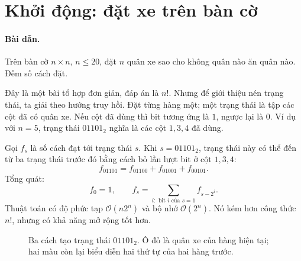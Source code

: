 \documentclass[11pt]{article}
\newcommand{\Oh}{\mathcal{O}}
\newcommand{\filledcell}[3]{\fill[#3] (#1,#2) rectangle ++(1,1);}
\begin{document}
\section{Khởi động: đặt xe trên bàn cờ}

\paragraph{Bài dẫn.}
Trên bàn cờ \(n\times n\), \(n\le 20\), đặt \(n\) quân xe sao cho không quân
nào ăn quân nào. Đếm số cách đặt.

Đây là một bài tổ hợp đơn giản, đáp án là \(n!\). Nhưng để giới thiệu nén
trạng thái, ta giải theo hướng truy hồi. Đặt từng hàng một; một trạng thái
là tập các cột đã có quân xe. Nếu cột đã dùng thì bit tương ứng là \(1\),
ngược lại là \(0\). Ví dụ với \(n=5\), trạng thái \(01101_2\) nghĩa là các
cột \(1,3,4\) đã dùng.

Gọi \(f_s\) là số cách đạt tới trạng thái \(s\). Khi \(s=01101_2\), trạng
thái này có thể đến từ ba trạng thái trước đó bằng cách bỏ lần lượt bit ở
cột \(1,3,4\):
\[
  f_{01101}=f_{01100}+f_{01001}+f_{00101}.
\]
Tổng quát:
\[
  f_0=1,\qquad
  f_s=\sum_{i:\text{ bit }i\text{ của }s=1} f_{s-2^i}.
\]
Thuật toán có độ phức tạp \(\Oh(n2^n)\) và bộ nhớ \(\Oh(2^n)\). Nó kém hơn
công thức \(n!\), nhưng có khả năng mở rộng tốt hơn.

\begin{figure}[ht]
\centering
{}
\caption{Ba cách tạo trạng thái \(01101_2\). Ô đỏ là quân xe của hàng hiện tại; hai màu còn lại biểu diễn hai thứ tự của hai hàng trước.}
\end{figure}
\end{document}
